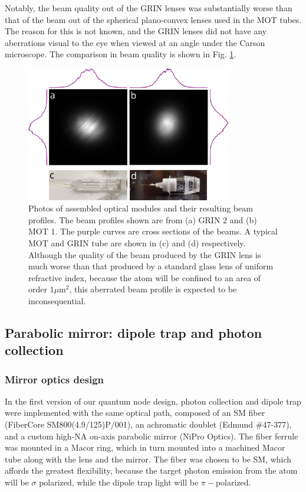 Notably, the beam quality out of the GRIN lenses was substantially worse than that of the beam out of the spherical plano-convex lenses used in the MOT tubes. The reason for this is not known, and the GRIN lenses did not have any aberrations visual to the eye when viewed at an angle under the Carson microscope. The comparison in beam quality is shown in Fig. \ref{fig:assembled_optical_tubes}.

\begin{figure}[ht]
    \centering
    \includegraphics[width=0.8\textwidth]{Images/MOT_and_GRIN_tubes.pdf}
    \caption{Photos of assembled optical modules and their resulting beam profiles. The beam profiles shown are from (a) GRIN 2 and (b) MOT 1. The purple curves are cross sections of the beams. A typical MOT and GRIN tube are shown in (c) and (d) respectively. Although the quality of the beam produced by the GRIN lens is much worse than that produced by a standard glass lens of uniform refractive index, because the atom will be confined to an area of order $1 \mu$m$^2$, this aberrated beam profile is expected to be inconsequential.}
    \label{fig:assembled_optical_tubes}
\end{figure}

\subsection{Parabolic mirror: dipole trap and photon collection}\label{sec:mirror}

\subsubsection{Mirror optics design}

In the first version of our quantum node design, photon collection and dipole trap were implemented with the same optical path, composed of an SM fiber (FiberCore SM800(4.9/125)P/001), an achromatic doublet (Edmund $\#$47-377), and a custom high-NA on-axis parabolic mirror (NiPro Optics). The fiber ferrule was mounted in a Macor ring, which in turn mounted into a machined Macor tube along with the lens and the mirror. The fiber was chosen to be SM, which affords the greatest flexibility, because the target photon emission from the atom will be $\sigma$ polarized, while the dipole trap light will be $\pi-$polarized. 

